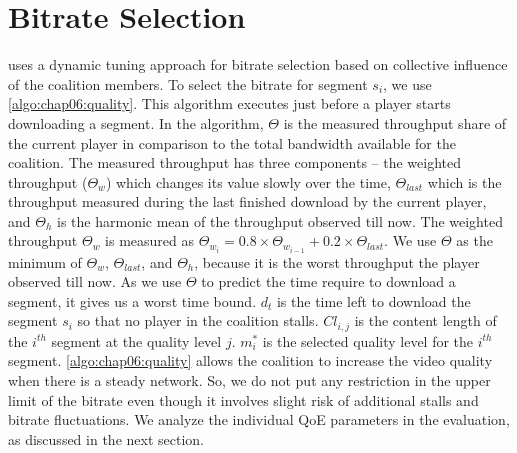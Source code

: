 \section{Bitrate Selection}
{\our} uses a dynamic tuning approach for bitrate selection based on collective influence of the coalition members. To select the bitrate for segment $s_i$, we use \algo\ref{algo:chap06:quality}. This algorithm executes just before a player starts downloading a segment. In the algorithm, $\varTheta$ is the measured throughput share of the current player in comparison to the total bandwidth available for the coalition. The measured throughput has three components -- the weighted throughput ($\varTheta_w$) which changes its value slowly over the time,  $\varTheta_{last}$ which is the throughput measured during the last finished download by the current player, and $\varTheta_h$ is the harmonic mean of the throughput observed till now. The weighted throughput $\varTheta_{w}$ is measured as $\varTheta_{w_i} = 0.8 \times \varTheta_{w_{i-1}} + 0.2 \times \varTheta_{last}$. We use $\varTheta$ as the minimum of $\varTheta_w$, $\varTheta_{last}$, and $\varTheta_h$, because it is the worst throughput the player observed till now. As we use $\varTheta$ to predict the time require to download a segment, it gives us a worst time bound. $d_t$ is the time left to download the segment $s_i$ so that no player in the coalition stalls. $Cl_{i,j}$ is the content length of the $i^{th}$ segment at the quality level $j$. $m^*_i$ is the selected quality level for the $i^{th}$ segment. \algo\ref{algo:chap06:quality} allows the coalition to increase the video quality when there is a steady network. So, we do not put any restriction in the upper limit of the bitrate even though it involves slight risk of additional stalls and bitrate fluctuations. We analyze the individual QoE parameters in the evaluation, as discussed in the next section.